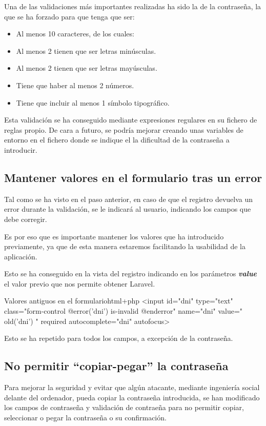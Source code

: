 \documentclass{\ClassPath/viu-tfm-template}
\begin{document}
Una de las validaciones más importantes realizadas ha sido la de la contraseña, la que se ha forzado para que tenga que ser:

\begin{itemize}
    \item Al menos 10 caracteres, de los cuales:
    \item Al menos 2 tienen que ser letras minúsculas.
    \item Al menos 2 tienen que ser letras mayúsculas.
    \item Tiene que haber al menos 2 números.
    \item Tiene que incluir al menos 1 símbolo tipográfico.
\end{itemize}

Esta validación se ha conseguido mediante expresiones regulares en su fichero de reglas propio. De cara a futuro, se podría mejorar creando unas variables de entorno en el fichero  donde se indique el la dificultad de la contraseña a introducir.

\subsection{Mantener valores en el formulario tras un error}
Tal como se ha visto en el paso anterior, en caso de que el registro devuelva un error durante la validación, se le indicará al usuario, indicando los campos que debe corregir.

Es por eso que es importante mantener los valores que ha introducido previamente, ya que de esta manera estaremos facilitando la usabilidad de la aplicación.

Esto se ha conseguido en la vista del registro indicando en los parámetros \textit{\textbf{value}} el valor previo que nos permite obtener Laravel.


\begin{mycode}{Valores antiguos en el formulario}{html+php}{}
<input id="dni" type="text" class="form-control
    @error('dni') is-invalid @enderror" name="dni"
    value="{{ old('dni') }}"
    required autocomplete="dni" autofocus>
\end{mycode}

Esto se ha repetido para todos los campos, a excepción de la contraseña.

\subsection{No permitir “copiar-pegar” la contraseña}
Para mejorar la seguridad y evitar que algún atacante, mediante ingeniería social delante del ordenador, pueda copiar la contraseña introducida, se han modificado los campos de contraseña y validación de contraeña para no permitir copiar, seleccionar o pegar la contraseña o su confirmación.
\end{document}
